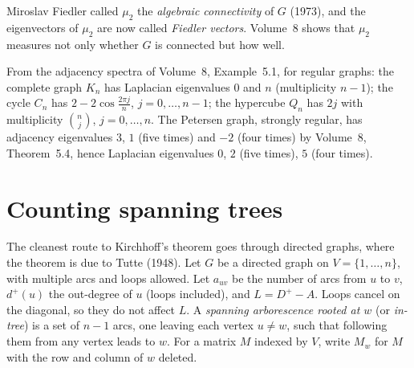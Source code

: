 Miroslav Fiedler called $\mu_2$ the \emph{algebraic connectivity} of $G$ (1973), and the eigenvectors of $\mu_2$ are now called \emph{Fiedler vectors}.
Volume~8 shows that $\mu_2$ measures not only whether $G$ is connected but how well.

\begin{example}\label{spectral:ex:lapspectra}
From the adjacency spectra of Volume~8, Example~5.1, for regular graphs: the complete graph $K_n$ has Laplacian eigenvalues $0$ and $n$ (multiplicity $n-1$);
the cycle $C_n$ has $2-2\cos\frac{2\pi j}n$, $j=0,\dots,n-1$; the hypercube $Q_n$ has $2j$ with multiplicity $\binom nj$, $j=0,\dots,n$. The Petersen graph, strongly regular,
has adjacency eigenvalues $3$, $1$ (five times) and $-2$ (four times) by Volume~8, Theorem~5.4, hence Laplacian eigenvalues $0$, $2$ (five times), $5$ (four times).
\end{example}

\section{Counting spanning trees}

The cleanest route to Kirchhoff's theorem goes through directed graphs, where the theorem is due to Tutte (1948). Let $G$ be a directed graph on
$V=\{1,\dots,n\}$, with multiple arcs and loops allowed. Let $a_{uv}$ be the number of arcs from $u$ to $v$, $d^+(u)$ the out-degree of $u$ (loops
included), and $L=D^+-A$. Loops cancel on the diagonal, so they do not affect $L$. A \emph{spanning arborescence rooted at $w$} (or \emph{in-tree}) is a set of
$n-1$ arcs, one leaving each vertex $u\ne w$, such that following them from any vertex leads to $w$. For a matrix $M$ indexed by $V$, write $M_w$ for $M$ with the row
and column of $w$ deleted.

